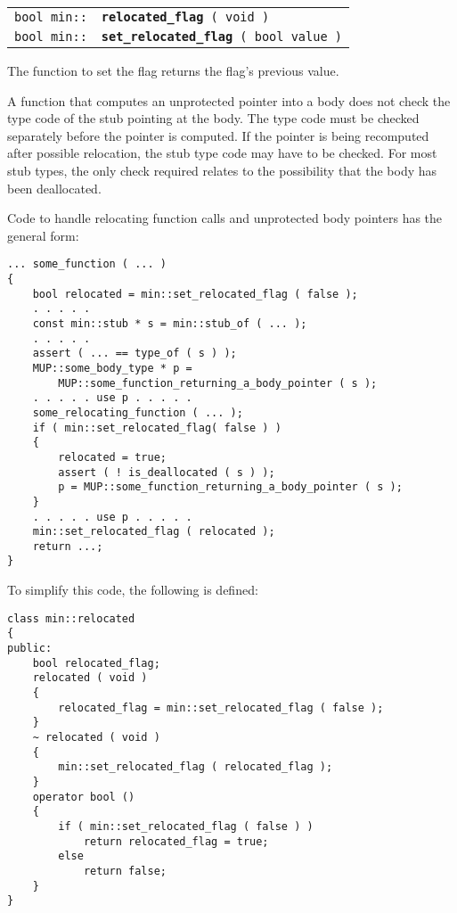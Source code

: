 \documentclass[12pt]{article}
\makeatletter
\newcommand{\ttindex}[1]{\index{#1@{\tt #1}}}
\newcommand{\minindex}[1]{\ttindex{min::#1}\ttindex{#1}}
\newenvironment{indpar}[1][0.3in]%
	{\begin{list}{}%
		     {\setlength{\itemsep}{0in}%
		      \setlength{\topsep}{0in}%
		      \setlength{\parsep}{1ex}%
		      \setlength{\labelwidth}{#1}%
		      \setlength{\leftmargin}{#1}%
		      \addtolength{\leftmargin}{\labelsep}}%
	 \item}%
	{\end{list}}
\newcommand{\LABEL}[1]{\label{#1}}
\newcommand{\MINKEY}[1]{{\tt \bf #1}\minindex{#1}}
\makeatother
\begin{document}
\begin{indpar}\begin{tabular}{r@{}l}
\verb|bool min::| & \MINKEY{relocated\_flag}\verb| ( void )|
\LABEL{MIN::RELOCATED_FLAG} \\
\verb|bool min::| & \MINKEY{set\_relocated\_flag}\verb| ( bool value )|
\LABEL{MIN::SET_RELOCATED_FLAG}
\end{tabular}\end{indpar}

The function to set the flag returns the flag's previous value.

A function that computes an unprotected pointer into a body does not
check the type code of the stub pointing at the body.  The type
code must be checked separately before the pointer is computed.  If the
pointer is being recomputed after possible relocation, the stub type
code may have to be checked.  For most stub types, the only check
required relates to the possibility that the body has been deallocated.

Code to handle relocating function calls and unprotected body
pointers has the general form:

\begin{indpar}\begin{verbatim}
... some_function ( ... )
{
    bool relocated = min::set_relocated_flag ( false );
    . . . . .
    const min::stub * s = min::stub_of ( ... );
    . . . . .
    assert ( ... == type_of ( s ) );
    MUP::some_body_type * p =
        MUP::some_function_returning_a_body_pointer ( s );
    . . . . . use p . . . . .
    some_relocating_function ( ... );
    if ( min::set_relocated_flag( false ) )
    {
        relocated = true;
        assert ( ! is_deallocated ( s ) );
        p = MUP::some_function_returning_a_body_pointer ( s );
    }
    . . . . . use p . . . . .
    min::set_relocated_flag ( relocated );
    return ...;
}
\end{verbatim}\end{indpar}

To simplify this code, the following is defined:

\begin{indpar}\begin{verbatim}
class min::relocated
{
public:
    bool relocated_flag;
    relocated ( void )
    {
        relocated_flag = min::set_relocated_flag ( false );
    }
    ~ relocated ( void )
    {
        min::set_relocated_flag ( relocated_flag );
    }
    operator bool ()
    {
        if ( min::set_relocated_flag ( false ) )
            return relocated_flag = true;
        else
            return false;
    }
}
\end{verbatim}\end{indpar}\LABEL{MIN::RELOCATED}
\end{document}
